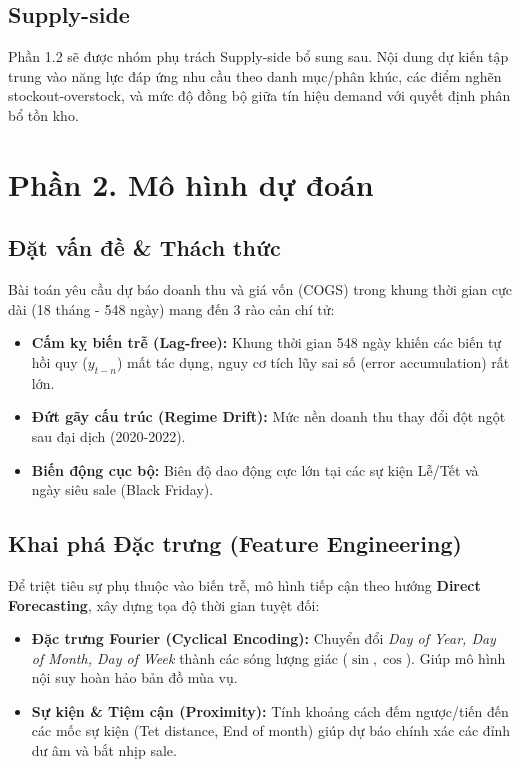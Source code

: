 \subsection{Supply-side}
Phần 1.2 sẽ được nhóm phụ trách Supply-side bổ sung sau. Nội dung dự kiến tập trung vào năng lực đáp ứng nhu cầu theo danh mục/phân khúc, các điểm nghẽn stockout-overstock, và mức độ đồng bộ giữa tín hiệu demand với quyết định phân bổ tồn kho.

\section{Phần 2. Mô hình dự đoán}
\subsection{Đặt vấn đề \& Thách thức}
Bài toán yêu cầu dự báo doanh thu và giá vốn (COGS) trong khung thời gian cực dài (18 tháng - 548 ngày) mang đến 3 rào cản chí tử:
\begin{itemize}[leftmargin=*, nosep]
    \item \textbf{Cấm kỵ biến trễ (Lag-free):} Khung thời gian 548 ngày khiến các biến tự hồi quy ($y_{t-n}$) mất tác dụng, nguy cơ tích lũy sai số (error accumulation) rất lớn.
    \item \textbf{Đứt gãy cấu trúc (Regime Drift):} Mức nền doanh thu thay đổi đột ngột sau đại dịch (2020-2022).
    \item \textbf{Biến động cục bộ:} Biên độ dao động cực lớn tại các sự kiện Lễ/Tết và ngày siêu sale (Black Friday).
\end{itemize}

\subsection{Khai phá Đặc trưng (Feature Engineering)}
Để triệt tiêu sự phụ thuộc vào biến trễ, mô hình tiếp cận theo hướng \textbf{Direct Forecasting}, xây dựng tọa độ thời gian tuyệt đối:
\begin{itemize}[leftmargin=*, nosep]
    \item \textbf{Đặc trưng Fourier (Cyclical Encoding):} Chuyển đổi \textit{Day of Year, Day of Month, Day of Week} thành các sóng lượng giác ($\sin, \cos$). Giúp mô hình nội suy hoàn hảo bản đồ mùa vụ.
    \item \textbf{Sự kiện \& Tiệm cận (Proximity):} Tính khoảng cách đếm ngược/tiến đến các mốc sự kiện (Tet distance, End of month) giúp dự báo chính xác các đỉnh dư âm và bắt nhịp sale.
\end{itemize}
